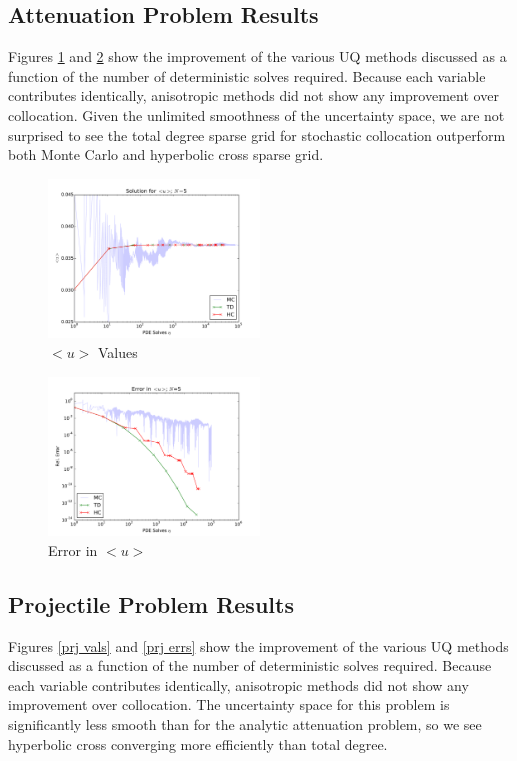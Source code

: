 \documentclass[11pt]{article}
\begin{document}
\subsection{Attenuation Problem Results}
Figures \ref{atn vals} and \ref{atn errs} show the improvement of the various UQ methods discussed as a function of the number of deterministic solves required.  Because each variable contributes identically, anisotropic methods did not show any improvement over collocation.  Given the unlimited smoothness of the uncertainty space, we are not surprised to see the total degree sparse grid for stochastic collocation outperform both Monte Carlo and hyperbolic cross sparse grid.
\begin{figure}[H]
    \centering
      \includegraphics[width=0.5\textwidth]{../graphics/attenuate_N5_soln}
      \caption{$<u>$ Values}
      \label{atn vals}
\end{figure}
\begin{figure}[H]
\centering
      \includegraphics[width=0.5\textwidth]{../graphics/attenuate_N5_conv}
      \caption{Error in $<u>$}
      \label{atn errs}
  \end{figure}

\subsection{Projectile Problem Results}
Figures \ref{prj vals} and \ref{prj errs} show the improvement of the various UQ methods discussed as a function of the number of deterministic solves required.  Because each variable contributes identically, anisotropic methods did not show any improvement over collocation.  The uncertainty space for this problem is significantly less smooth than for the analytic attenuation problem, so we see hyperbolic cross converging more efficiently than total degree.  \\
\end{document}
